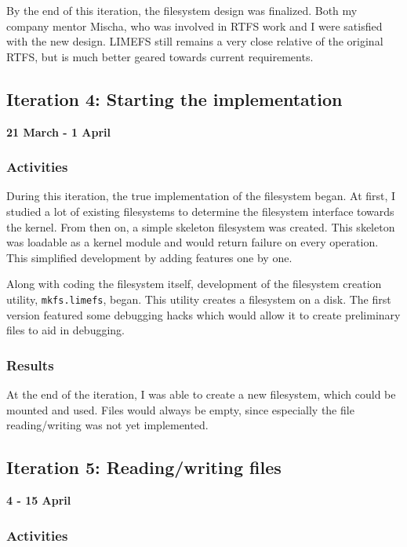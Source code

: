 By the end of this iteration, the filesystem design was finalized. Both my company mentor Mischa, who was involved in RTFS work and I were satisfied with the new design. LIMEFS still remains a very close relative of the original RTFS, but is much better geared towards current requirements.

\subsection{Iteration 4: Starting the implementation}

\textbf{21 March - 1 April}

\subsubsection{Activities}

During this iteration, the true implementation of the filesystem began. At first, I studied a lot of existing filesystems to determine the filesystem interface towards the kernel. From then on, a simple skeleton filesystem was created. This skeleton was loadable as a kernel module and would return failure on every operation. This simplified development by adding features one by one.

Along with coding the filesystem itself, development of the filesystem creation utility, \texttt{mkfs.limefs}, began. This utility creates a filesystem on a disk. The first version featured some debugging hacks which would allow it to create preliminary files to aid in debugging.

\subsubsection{Results}

At the end of the iteration, I was able to create a new filesystem, which could be mounted and used. Files would always be empty, since especially the file reading/writing was not yet implemented.

\subsection{Iteration 5: Reading/writing files}

\textbf{4 - 15 April}

\subsubsection{Activities}

